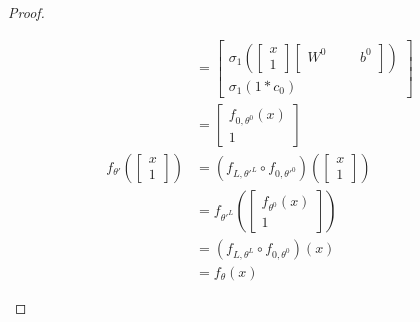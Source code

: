 \documentclass[a4paper]{article}
\theoremstyle{definition}
\begin{document}
\begin{proof}
\begin{enumerate}
\begin{align}
            &=\begin{bmatrix}
                \sigma_1(\begin{bmatrix}x\\1\end{bmatrix}\begin{bmatrix}
                    W^0 & & & b^0\\
                \end{bmatrix})\\
                \sigma_1(1*c_0)
            \end{bmatrix}\\
            &=\begin{bmatrix}
                f_{0,\theta^0}(x)\\
                1
            \end{bmatrix}\\
            f_{\theta'}(\begin{bmatrix}x\\1\end{bmatrix}) &=(f_{L,\theta'^L} \circ f_{0,\theta'^0}) (\begin{bmatrix}x\\1\end{bmatrix})\\
            &= f_{\theta'^L}(\begin{bmatrix}
                f_{\theta^0}(x)\\
                1
            \end{bmatrix})\\
            &= (f_{L,\theta^L} \circ f_{0,\theta^0})(x)\\
            &= f_{\theta}(x)
        \end{align}
    \end{enumerate}
\end{proof}




\end{document}
